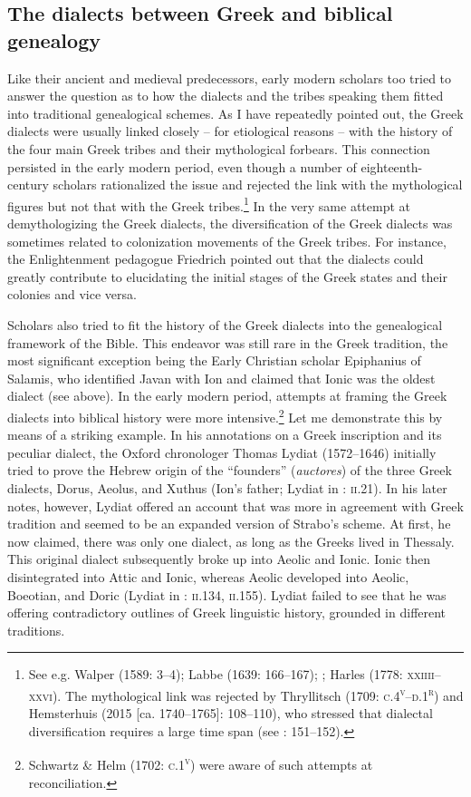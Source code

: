 \subsection{The dialects between Greek and biblical genealogy}
\hypertarget{Toc19704837}{}
Like their ancient and medieval predecessors, early modern scholars too tried to answer the question as to how the dialects and the tribes speaking them fitted into traditional genealogical schemes. As I have repeatedly pointed out, the Greek dialects were usually linked closely – for etiological reasons – with the history of the four main Greek tribes and their mythological forbears. This connection persisted in the early modern period, even though a number of eighteenth-century scholars rationalized the issue and rejected the link with the mythological figures but not that with the Greek tribes.\footnote{See e.g. Walper (1589: 3–4); Labbe (1639: 166–167); \citet[73]{Vitringa1689}; Harles (1778: \textsc{xxiiii–xxvi}). The mythological link was rejected by Thryllitsch (1709: \textsc{c.4}\textsc{\textsuperscript{v}}\textsc{–d.1}\textsc{\textsuperscript{r}}) and Hemsterhuis (2015 [ca. 1740–1765]: 108–110), who stressed that dialectal diversification requires a large time span (see \citealt{Gerretzen1940}: 151–152).} In the very same attempt at demythologizing the Greek dialects, the diversification of the Greek dialects was sometimes related to colonization movements of the Greek tribes. For instance, the Enlightenment pedagogue Friedrich \citet[12]{Gedike1782} pointed out that the dialects could greatly contribute to elucidating the initial stages of the Greek states and their colonies and vice versa.

Scholars also tried to fit the history of the Greek dialects into the genealogical framework of the Bible. This endeavor was still rare in the Greek tradition, the most significant exception being the Early Christian scholar Epiphanius of Salamis, who identified Javan with Ion and claimed that Ionic was the oldest dialect (see  above). In the early modern period, attempts at framing the Greek dialects into biblical history were more intensive.\footnote{Schwartz \& Helm (1702: \textsc{c.1}\textsc{\textsuperscript{v}}) were aware of such attempts at reconciliation.} Let me demonstrate this by means of a striking example. In his annotations on a Greek inscription and its peculiar dialect, the Oxford chronologer Thomas Lydiat (1572–1646) initially tried to prove the Hebrew origin of the “founders” (\textit{auctores}) of the three Greek dialects, Dorus, Aeolus, and Xuthus (Ion’s father; Lydiat in \citealt{Prideaux1676}: \textsc{ii}.21). In his later notes, however, Lydiat offered an account that was more in agreement with Greek tradition and seemed to be an expanded version of Strabo’s scheme. At first, he now claimed, there was only one dialect, as long as the Greeks lived in Thessaly. This original dialect subsequently broke up into Aeolic and Ionic. Ionic then disintegrated into Attic and Ionic, whereas Aeolic developed into Aeolic, Boeotian, and Doric (Lydiat in \citealt{Prideaux1676}: \textsc{ii.134}, \textsc{ii.}155). Lydiat failed to see that he was offering contradictory outlines of Greek linguistic history, grounded in different traditions.

